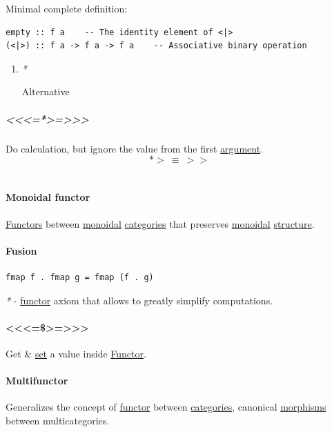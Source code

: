\documentclass[11pt]{article}
\begin{document}
Minimal complete definition:\\
\begin{verbatim}
empty :: f a    -- The identity element of <|>
(<|>) :: f a -> f a -> f a    -- Associative binary operation
\end{verbatim}

\begin{enumerate}
\item \emph{*}
\label{sec:org0e6c2d6}

\label{org1636559}Alternative\\
\end{enumerate}

\subparagraph{<<<=*>=>>>}
\label{sec:org337e340}
Do calculation, but ignore the value from the first \hyperref[orgf66a5f7]{argument}.\\

$$ *> \ \equiv \ >> $$\\

\paragraph{\label{org9ca82f5}Monoidal functor}
\label{sec:orgdb43223}
\hyperref[org6c3c2a6]{Functors} between \hyperref[org71af906]{monoidal} \hyperref[org43ea200]{categories} that preserves \hyperref[org71af906]{monoidal} \hyperref[org93ee82c]{structure}.\\

\paragraph{\label{orgc7afdd4}Fusion}
\label{sec:orgdcb8ae3}
\begin{verbatim}
fmap f . fmap g = fmap (f . g)
\end{verbatim}

\emph{*} - \hyperref[org6073683]{functor} axiom that allows to greatly simplify computations.\\

\paragraph{<<<=\$>=>>>}
\label{sec:org0ab345d}
Get \& \hyperref[orgbed80ba]{set} a value inside \hyperref[org6073683]{Functor}.\\

\paragraph{\label{orgf66f5e8}Multifunctor}
\label{sec:orgedcb69a}
Generalizes the concept of \hyperref[org6073683]{functor} between \hyperref[org43ea200]{categories}, canonical \hyperref[org8ed0ce8]{morphisms} between multicategories.\\
\end{document}

